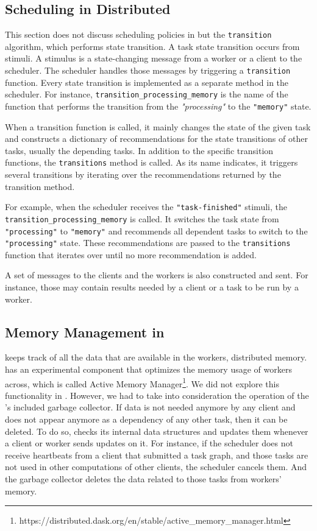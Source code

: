 \subsection{Scheduling in \dask Distributed}\label{sec:scheduling}

This section does not discuss \dask scheduling policies in \dask but the \texttt{transition} algorithm, which performs state transition.
A task state transition occurs from stimuli. A stimulus is a state-changing message from a worker or a client to the scheduler. 
The scheduler handles those messages by triggering a \texttt{transition} function. Every state transition is implemented as a separate method in the scheduler. For instance, \texttt{transition\_processing\_memory} is the name of the function that performs the transition from the \textit{"processing"} to the \texttt{"memory"} state.

When a transition function is called, it mainly changes the state of the given task and constructs a dictionary of recommendations for the state transitions of other tasks, usually the depending tasks. In addition to the specific transition functions, the \texttt{transitions} method is called. As its name indicates, it triggers several transitions by iterating over the recommendations returned by the transition method. 

For example, when the scheduler receives the \texttt{"task-finished"} stimuli, the \texttt{transition\_processing\_memory} is called. It switches the task state from \texttt{"processing"} to \texttt{"memory"} and recommends all dependent tasks to switch to the \texttt{"processing"} state. These recommendations are passed to the \texttt{transitions} function that iterates over until no more recommendation is added.

A set of messages to the clients and the workers is also constructed and sent. For instance, those may contain results needed by a client or a task to be run by a worker.

\subsection{Memory Management in \dask}
\dask keeps track of all the data that are available in the workers, distributed memory. \dask has an experimental component that optimizes the memory usage of workers across, which is called Active Memory Manager\footnote{https://distributed.dask.org/en/stable/active\_memory\_manager.html}. 
We did not explore this functionality in \dask. However, we had to take into consideration the operation of the \dask's included garbage collector. 
If data is not needed anymore by any client and does not appear anymore as a dependency of any other task, then it can be deleted. To do so, \dask checks its internal data structures and updates them whenever a client or worker sends updates on it. 
For instance, if the scheduler does not receive heartbeats from a client that submitted a task graph, and those tasks are not used in other computations of other clients, the scheduler cancels them. And the garbage collector deletes the data related to those tasks from workers' memory.  

